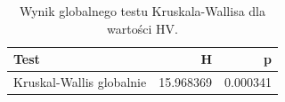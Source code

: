 \begin{table}
\caption{Wynik globalnego testu Kruskala-Wallisa dla wartości HV.}
\label{tab:kruskal_global}
\begin{tabular}{lrr}
\toprule
Test & H & p \\
\midrule
Kruskal-Wallis globalnie & 15.968369 & 0.000341 \\
\bottomrule
\end{tabular}
\end{table}
